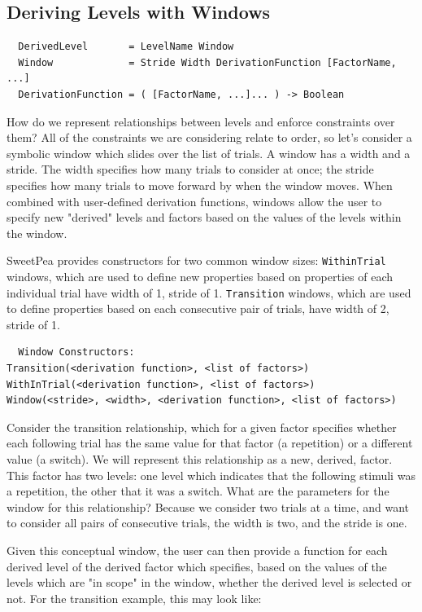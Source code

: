 \subsection{Deriving Levels with Windows}

\begin{verbatim}
  DerivedLevel       = LevelName Window
  Window             = Stride Width DerivationFunction [FactorName, ...]
  DerivationFunction = ( [FactorName, ...]... ) -> Boolean
\end{verbatim}

How do we represent relationships between levels and enforce constraints over them? All of the constraints we are considering relate to order, so let's consider a symbolic window which slides over the list of trials. A window has a width and a stride. The width specifies how many trials to consider at once; the stride specifies how many trials to move forward by when the window moves. When combined with user-defined derivation functions, windows allow the user to specify new "derived" levels and factors based on the values of the levels within the window.

SweetPea provides constructors for two common window sizes: \texttt{WithinTrial} windows, which are used to define new properties based on properties of each individual trial have width of 1, stride of 1. \texttt{Transition} windows, which are used to define properties based on each consecutive pair of trials, have width of 2, stride of 1.

\begin{verbatim}
  Window Constructors:
Transition(<derivation function>, <list of factors>)
WithInTrial(<derivation function>, <list of factors>)
Window(<stride>, <width>, <derivation function>, <list of factors>)
\end{verbatim}

Consider the transition relationship, which for a given factor specifies whether each following trial has the same value for that factor (a repetition) or a different value (a switch). We will represent this relationship as a new, derived, factor. This factor has two levels: one level which indicates that the following stimuli was a repetition, the other that it was a switch. What are the parameters for the window for this relationship? Because we consider two trials at a time, and want to consider all pairs of consecutive trials, the width is two, and the stride is one.

Given this conceptual window, the user can then provide a function for each derived level of the derived factor which specifies, based on the values of the levels which are "in scope" in the window, whether the derived level is selected or not. For the transition example, this may look like:

